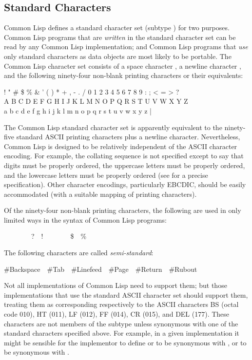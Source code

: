 \subsection{Standard Characters}

Common Lisp defines a standard character set (subtype )
for two purposes.
Common Lisp programs that are \emph{written} in the standard character set
can be read by any Common Lisp implementation; and Common Lisp programs
that \emph{use} only standard characters as data objects are most likely
to be portable.  The Common Lisp character set consists of a space character
, a newline character , and the
following ninety-four
non-blank printing characters or their equivalents:
\begin{lisp}
! " \# \$ \% \& ' ( ) * + , - . / 0 1 2 3 4 5 6 7 8 9 : ; < = > ? \\
{\Xatsign} A B C D E F G H I J K L M N O P Q R S T U V W X Y Z {\Xlbracket} {\Xbackslash} {\Xrbracket} {\Xcircumflex} {\Xunderscore} \\
{\Xbq} a b c d e f g h i j k l m n o p q r s t u v w x y z {\Xlbrace} | {\Xrbrace} {\Xtilde}
\end{lisp}
The Common Lisp standard character set is apparently equivalent to
the ninety-five standard ASCII printing characters plus a newline character.
Nevertheless, Common Lisp is designed to be relatively independent of
the ASCII character encoding.  For example, the collating sequence
is not specified except to say that digits must be properly ordered,
the uppercase letters must be properly ordered, and
the lowercase letters must be properly ordered
(see  for a precise specification).
Other character encodings, particularly EBCDIC, should be easily accommodated
(with a suitable mapping of printing characters).

Of the ninety-four non-blank printing characters, the following are
used in only limited ways in the syntax of Common Lisp programs:
\begin{lisp}
{\Xlbracket}~~{\Xrbracket}~~{\Xlbrace}~~{\Xrbrace}~~?~~!~~{\Xcircumflex}~~{\Xunderscore}~~{\Xtilde}~~\$~~\% 
\end{lisp}

The following characters are called \emph{semi-standard}:
\begin{lisp}
\#{\Xbackslash}Backspace~~\#{\Xbackslash}Tab~~\#{\Xbackslash}Linefeed~~\#{\Xbackslash}Page~~\#{\Xbackslash}Return~~\#{\Xbackslash}Rubout
\end{lisp}
Not all implementations of Common Lisp need to support them; but those
implementations that
use the standard ASCII character set should support them, treating them as
corresponding respectively to the ASCII characters BS (octal code 010),
HT (011), LF (012), FF (014), CR (015), and DEL
(177). These characters are not
members of the subtype  unless synonymous with
one of the standard characters specified above.
For example, in a given implementation it might
be sensible for the implementor to define
 or  to be synonymous with ,
or  to be synonymous with .

